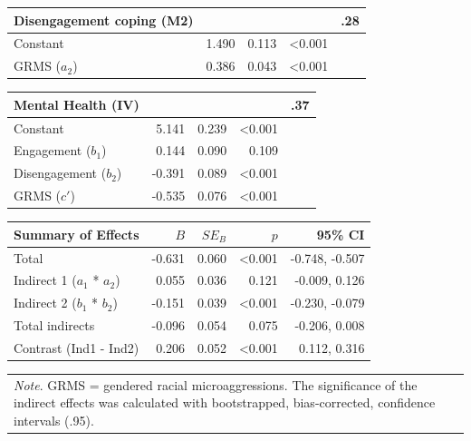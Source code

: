 \documentclass[
  11pt,
]{book}
\begin{document}
\begin{longtable}[]{@{}lrrrr@{}}
\toprule\noalign{}
Disengagement coping (M2) & & & & .28 \\
\midrule\noalign{}
\endhead
\bottomrule\noalign{}
\endlastfoot
Constant & 1.490 & 0.113 & \textless0.001 & \\
GRMS (\(a_2\)) & 0.386 & 0.043 & \textless0.001 & \\
\end{longtable}

\begin{longtable}[]{@{}lrrrr@{}}
\toprule\noalign{}
Mental Health (IV) & & & & .37 \\
\midrule\noalign{}
\endhead
\bottomrule\noalign{}
\endlastfoot
Constant & 5.141 & 0.239 & \textless0.001 & \\
Engagement (\(b_1\)) & 0.144 & 0.090 & 0.109 & \\
Disengagement (\(b_2\)) & -0.391 & 0.089 & \textless0.001 & \\
GRMS (\(c'\)) & -0.535 & 0.076 & \textless0.001 & \\
\end{longtable}

\begin{longtable}[]{@{}lrrrr@{}}
\toprule\noalign{}
Summary of Effects & \(B\) & \(SE_{B}\) & \(p\) & 95\% CI \\
\midrule\noalign{}
\endhead
\bottomrule\noalign{}
\endlastfoot
Total & -0.631 & 0.060 & \textless0.001 & -0.748, -0.507 \\
Indirect 1 (\(a_1\) * \(a_2\)) & 0.055 & 0.036 & 0.121 & -0.009, 0.126 \\
Indirect 2 (\(b_1\) * \(b_2\)) & -0.151 & 0.039 & \textless0.001 & -0.230, -0.079 \\
Total indirects & -0.096 & 0.054 & 0.075 & -0.206, 0.008 \\
Contrast (Ind1 - Ind2) & 0.206 & 0.052 & \textless0.001 & 0.112, 0.316 \\
\end{longtable}

\begin{longtable}[]{@{}
  >{\raggedright\arraybackslash}p{}@{}}
\toprule\noalign{}
\endhead
\bottomrule\noalign{}
\endlastfoot
\emph{Note}. GRMS = gendered racial microaggressions. The significance of the indirect effects was calculated with bootstrapped, bias-corrected, confidence intervals (.95). \\
\end{longtable}
\end{document}
